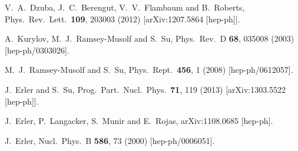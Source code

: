\begin{thebibliography}{99}
  V.~A.~Dzuba, J.~C.~Berengut, V.~V.~Flambaum and B.~Roberts,
  Phys.\ Rev.\ Lett.\  {\bf 109}, 203003 (2012)
  [arXiv:1207.5864 [hep-ph]].

  A.~Kurylov, M.~J.~Ramsey-Musolf and S.~Su,
  Phys.\ Rev.\ D {\bf 68}, 035008 (2003)
  [hep-ph/0303026].

  M.~J.~Ramsey-Musolf and S.~Su,
  Phys.\ Rept.\  {\bf 456}, 1 (2008)
  [hep-ph/0612057].

  J.~Erler and S.~Su,
  Prog.\ Part.\ Nucl.\ Phys.\  {\bf 71}, 119 (2013)
  [arXiv:1303.5522 [hep-ph]].

  J.~Erler, P.~Langacker, S.~Munir and E.~Rojas,
  arXiv:1108.0685 [hep-ph].

  J.~Erler,
  Nucl.\ Phys.\ B {\bf 586}, 73 (2000)
  [hep-ph/0006051].




\end{thebibliography}
